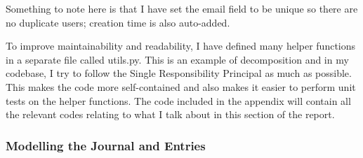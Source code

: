 Something to note here is that I have set the email field to be unique so there are no duplicate users; creation time is also auto-added.

To improve maintainability and readability, I have defined many helper functions in a separate file called utils.py. This is an example of decomposition and in my codebase, I try to follow the Single Responsibility Principal as much as possible. This makes the code more self-contained and also makes it easier to perform unit tests on the helper functions. The code included in the appendix will contain all the relevant codes relating to what I talk about in this section of the report.


\subsubsection{Modelling the Journal and Entries}
